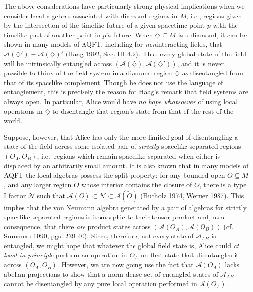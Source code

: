 \documentclass[12pt]{article}
\newcommand{\alg}[1]{\mbox{$\mathcal{#1}$}}
\begin{document}
 The above considerations have particularly strong physical 
 implications when we consider local algebras associated with diamond 
 regions in $M$, i.e., regions given by the intersection of the 
 timelike future of a given spacetime point $p$ with the timelike past of 
 another point in $p$'s future.  
When $\diamondsuit\subseteq M$ is a diamond,  it can be shown in many models of 
AQFT, including for \emph{non}interacting fields, that
 $\alg{A}(\diamondsuit')=\alg{A}(\diamondsuit)'$ (Haag 
 1992, Sec. III.4.2).  
 Thus every global state of the field 
 will be intrinsically entangled across $(\alg{A}(\diamondsuit),\alg{A}(\diamondsuit'))$, and it is 
 never possible to think of the field system in a diamond region $\diamondsuit$ as disentangled from 
 that of its spacelike complement.  Though he does not use the 
 language of entanglement, this is precisely the reason 
 for Haag's remark that field systems are always 
 open.  In particular, Alice would have \emph{no hope 
 whatsoever} of using local operations in $\diamondsuit$ to disentangle that 
 region's state from that of the rest of the world.  
 
 Suppose, however, that Alice has only the more limited goal of 
 disentangling a state of the field across some isolated pair of 
 \emph{strictly} spacelike-separated regions 
 $(O_{A},O_{B})$, i.e., regions which remain spacelike 
 separated when either is displaced by an arbitrarily small amount.  
  It is also known that in many models of AQFT  the local 
 algebras possess the split property: for any bounded open $O\subseteq 
 M$, and any larger region $\tilde{O}$ whose interior contains the 
 closure of $O$, there is a type I factor $\alg{N}$ such that 
 $\alg{A}(O)\subset \alg{N}\subset\alg{A}(\tilde{O})$ (Bucholz 1974, Werner 
 1987).  This implies that the von Neumann algebra generated by a pair 
 of algebras for strictly spacelike separated regions is isomorphic to their tensor 
 product and, as a consequence, that there \emph{are} product states across 
 $(\alg{A}(O_{A}),\alg{A}(O_{B}))$ (cf. Summers 1990, pgs. 
 239-40).  Since, therefore, not every state 
 of $\alg{A}_{AB}$ is entangled, we might hope that whatever the global field 
 state is, 
 Alice could \emph{at least in principle} 
 perform an operation in $O_{A}$ on that state that disentangles it across 
 $(O_{A},O_{B})$.  However, we are now going use the fact that  
 $\alg{A}(O_{A})$ lacks abelian projections  to show that a norm 
 dense set of entangled states of
       $\alg{A}_{AB}$ cannot be disentangled by 
       any pure local operation performed in $\alg{A}(O_{A})$. 
                   
\end{document}
